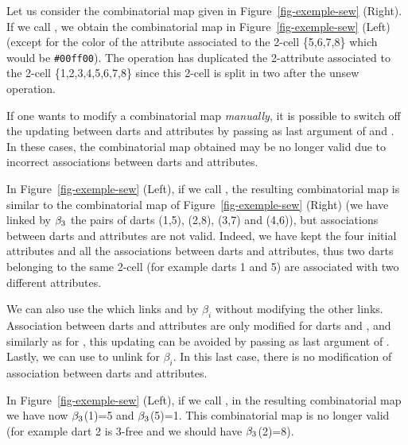 Let us consider the combinatorial map given in
Figure~\ref{fig-exemple-sew} (Right). If we call , we
obtain the combinatorial map in Figure~\ref{fig-exemple-sew} (Left)
(except for the color of the attribute associated to the
2-cell \{5,6,7,8\} which would be \texttt{\#00ff00}).  The 
operation has duplicated the 2-attribute associated to the 2-cell
\{1,2,3,4,5,6,7,8\} since this 2-cell is split in two after the
unsew operation.

\begin{ccAdvanced}
  If one wants to modify a combinatorial map \emph{manually}, it is 
  possible to switch off the updating between
  darts and attributes by passing  as last argument of
   and
  .  In these cases, the
  combinatorial map obtained may be no longer valid due to incorrect
  associations between darts and attributes.
  
  In Figure~\ref{fig-exemple-sew} (Left), if we call
  , the resulting combinatorial map is similar
  to the combinatorial map of Figure~\ref{fig-exemple-sew} (Right)
  (we have linked by $\beta_{3}$ the pairs of darts (1,5), (2,8),
  (3,7) and (4,6)), but associations between darts and attributes
  are not valid. Indeed, we have kept the four initial attributes
  and all the associations between darts and attributes, thus two
  darts belonging to the same 2-cell (for example darts 1 and 5) are
  associated with two different attributes.

  We can also use the
   which links
   and  by $\beta_i$ without modifying the other
  links.
  Association between darts and attributes are only modified for darts
   and , and similarly as for , this
  updating can be avoided by passing  as last argument of
  .  Lastly, we can use
   to unlink  for $\beta_i$. In this
  last case, there is no modification of association between darts and
  attributes.

  In Figure~\ref{fig-exemple-sew} (Left), if we call
  , in the resulting combinatorial map we have
  now $\beta_{3}$(1)=5 and $\beta_{3}$(5)=1. This combinatorial map is no
  longer valid (for example dart 2 is 3-free and we should have
  $\beta_{3}$(2)=8).

\end{ccAdvanced}

